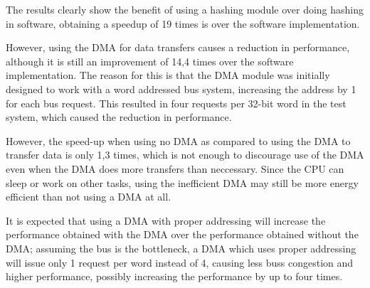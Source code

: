 The results clearly show the benefit of using a hashing module over doing hashing in software,
obtaining a speedup of 19 times is over the software implementation.

However, using the DMA for data transfers causes a reduction in performance, although it is still
an improvement of 14,4 times over the software implementation. The reason for this is that the
DMA module was initially designed to work with a word addressed bus system, increasing the
address by 1 for each bus request. This resulted in four requests per 32-bit word in
the test system, which caused the reduction in performance.

However, the speed-up when using no DMA as compared to using the DMA to transfer data is only
1,3 times, which is not enough to discourage use of the DMA even when the DMA does more transfers
than neccessary. Since the CPU can sleep or work on other tasks, using the inefficient DMA may
still be more energy efficient than not using a DMA at all.

It is expected that using a DMA with proper addressing will increase the performance obtained
with the DMA over the performance obtained without the DMA; assuming the bus is the bottleneck,
a DMA which uses proper addressing will issue only 1 request per word instead of 4, causing
less buss congestion and higher performance, possibly increasing the performance by up to
four times.

